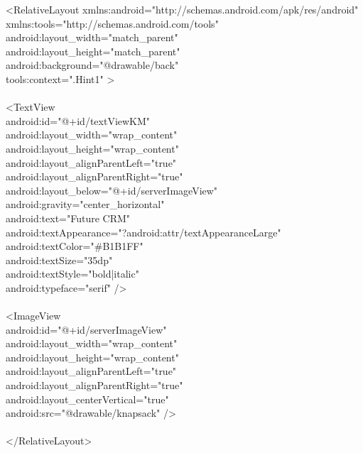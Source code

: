 \documentclass[12pt,a4paper]{article}
\begin{document}
\hspace{0.7 cm}<RelativeLayout xmlns:android="http://schemas.android.com/apk/res/android"\\
    xmlns:tools="http://schemas.android.com/tools"\\
    android:layout_width="match_parent"\\
    android:layout_height="match_parent"\\
   android:background="@drawable/back"\\
    tools:context=".Hint1" >\\
\\
    <TextView\\
        android:id="@+id/textViewKM"\\
        android:layout_width="wrap_content"\\
        android:layout_height="wrap_content"\\
        android:layout_alignParentLeft="true"\\
        android:layout_alignParentRight="true"\\
        android:layout_below="@+id/serverImageView"\\
        android:gravity="center_horizontal"\\
        android:text="Future CRM"\\
        android:textAppearance="?android:attr/textAppearanceLarge"\\
        android:textColor="#B1B1FF"\\
        android:textSize="35dp"\\
        android:textStyle="bold|italic"\\
        android:typeface="serif" />\\
\\
    <ImageView\\
        android:id="@+id/serverImageView"\\
        android:layout_width="wrap_content"\\
        android:layout_height="wrap_content"\\
        android:layout_alignParentLeft="true"\\
        android:layout_alignParentRight="true"\\
        android:layout_centerVertical="true"\\
        android:src="@drawable/knapsack" />\\
\\
</RelativeLayout>\\
\\
\newpage
\\
\end{document}
